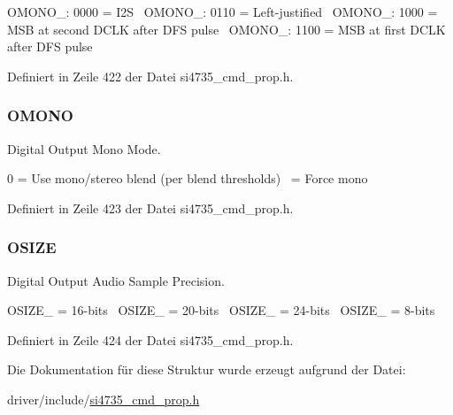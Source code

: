 O\+M\+O\+N\+O\+\_\+: 0000 = I2\+S~\newline
O\+M\+O\+N\+O\+\_\+: 0110 = Left-\/justified~\newline
O\+M\+O\+N\+O\+\_\+: 1000 = M\+S\+B at second D\+C\+L\+K after D\+F\+S pulse~\newline
O\+M\+O\+N\+O\+\_\+: 1100 = M\+S\+B at first D\+C\+L\+K after D\+F\+S pulse 

Definiert in Zeile 422 der Datei si4735\+\_\+cmd\+\_\+prop.\+h.

\hypertarget{uniondout__format_a93761dc84dd5d349d8133cbd92a5f9b5}{}
\subsubsection[{O\+M\+O\+N\+O}]{\setlength{\rightskip}{0pt plus 5cm}O\+M\+O\+N\+O}\label{uniondout__format_a93761dc84dd5d349d8133cbd92a5f9b5}


Digital Output Mono Mode. 

0 = Use mono/stereo blend (per blend thresholds)~ = Force mono 

Definiert in Zeile 423 der Datei si4735\+\_\+cmd\+\_\+prop.\+h.

\hypertarget{uniondout__format_a7b03eaf984aaf8efadcedcfabd0df922}{}
\subsubsection[{O\+S\+I\+Z\+E}]{\setlength{\rightskip}{0pt plus 5cm}O\+S\+I\+Z\+E}\label{uniondout__format_a7b03eaf984aaf8efadcedcfabd0df922}


Digital Output Audio Sample Precision. 

O\+S\+I\+Z\+E\+\_ = 16-\/bits~\newline
O\+S\+I\+Z\+E\+\_ = 20-\/bits~\newline
O\+S\+I\+Z\+E\+\_ = 24-\/bits~\newline
O\+S\+I\+Z\+E\+\_ = 8-\/bits 

Definiert in Zeile 424 der Datei si4735\+\_\+cmd\+\_\+prop.\+h.



Die Dokumentation für diese Struktur wurde erzeugt aufgrund der Datei\+:\begin{DoxyCompactItemize}
\item 
driver/include/\hyperlink{si4735__cmd__prop_8h}{si4735\+\_\+cmd\+\_\+prop.\+h}\end{DoxyCompactItemize}
